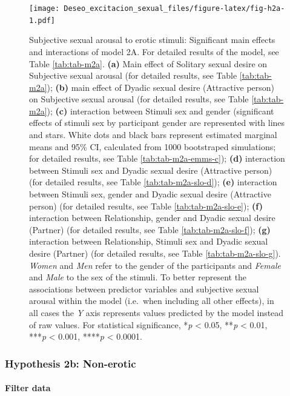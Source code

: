 \documentclass[
  bookmarksnumbered]{article}
\begin{document}
\begin{figure}
\centering
\texttt{[image: Deseo\_excitacion\_sexual\_files/figure-latex/fig-h2a-1.pdf]}
\caption{\label{fig:fig-h2a}Subjective sexual arousal to erotic stimuli: Significant main effects and interactions of model 2A. For detailed results of the model, see Table \ref{tab:tab-m2a}. \textbf{(a)} Main effect of Solitary sexual desire on Subjective sexual arousal (for detailed results, see Table \ref{tab:tab-m2a}); \textbf{(b)} main effect of Dyadic sexual desire (Attractive person) on Subjective sexual arousal (for detailed results, see Table \ref{tab:tab-m2a}); \textbf{(c)} interaction between Stimuli sex and gender (significant effects of stimuli sex by participant gender are represented with lines and stars. White dots and black bars represent estimated marginal means and 95\% CI, calculated from 1000 bootstraped simulations; for detailed results, see Table \ref{tab:tab-m2a-emms-c}); \textbf{(d)} interaction between Stimuli sex and Dyadic sexual desire (Attractive person) (for detailed results, see Table \ref{tab:tab-m2a-slo-d}); \textbf{(e)} interaction between Stimuli sex, gender and Dyadic sexual desire (Attractive person) (for detailed results, see Table \ref{tab:tab-m2a-slo-e}); \textbf{(f)} interaction between Relationship, gender and Dyadic sexual desire (Partner) (for detailed results, see Table \ref{tab:tab-m2a-slo-f}); \textbf{(g)} interaction between Relationship, Stimuli sex and Dyadic sexual desire (Partner) (for detailed results, see Table \ref{tab:tab-m2a-slo-g}). \emph{Women} and \emph{Men} refer to the gender of the participants and \emph{Female} and \emph{Male} to the sex of the stimuli. To better represent the associations between predictor variables and subjective sexual arousal within the model (i.e.~when including all other effects), in all cases the \emph{Y} axis represents values predicted by the model instead of raw values. For statistical significance, *\emph{p} \textless{} 0.05, **\emph{p} \textless{} 0.01, ***\emph{p} \textless{} 0.001, ****\emph{p} \textless{} 0.0001.}
\end{figure}

\hypertarget{hypothesis2b}{%
\subsubsection{Hypothesis 2b: Non-erotic}\label{hypothesis2b}}

\hypertarget{filter-data-2}{%
\paragraph{Filter data}\label{filter-data-2}}
\end{document}
